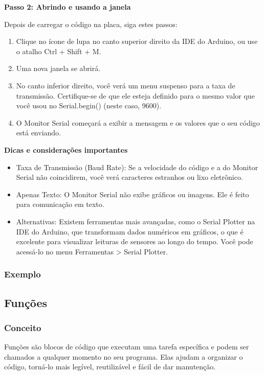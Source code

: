 \documentclass{report}
\begin{document}
	\begin{large}
		\textbf{Passo 2: Abrindo e usando a janela}
		\\
	\end{large}
	
	Depois de carregar o código na placa, siga estes passos:
	
	\begin{enumerate}
		\item Clique no ícone de lupa no canto superior direito da IDE do Arduino, ou use o atalho Ctrl + Shift + M.
		\item Uma nova janela se abrirá.
		\item No canto inferior direito, você verá um menu suspenso para a taxa de transmissão. Certifique-se de que ele esteja definido para o mesmo valor que você usou no Serial.begin() (neste caso, 9600).
		\item O Monitor Serial começará a exibir a mensagem e os valores que o seu código está enviando.
	\end{enumerate}
	
	\begin{large}
		\textbf{Dicas e considerações importantes}
		\\
	\end{large}
	\begin{itemize}
		\item Taxa de Transmissão (Baud Rate): Se a velocidade do código e a do Monitor Serial não coincidirem, você verá caracteres estranhos ou lixo eletrônico.
		\item Apenas Texto: O Monitor Serial não exibe gráficos ou imagens. Ele é feito para comunicação em texto.
		\item Alternativas: Existem ferramentas mais avançadas, como o Serial Plotter na IDE do Arduino, que transformam dados numéricos em gráficos, o que é excelente para visualizar leituras de sensores ao longo do tempo. Você pode acessá-lo no menu Ferramentas > Serial Plotter.
	\end{itemize}
	\subsubsection{Exemplo}
	\subsection{Funções}
	\subsubsection{Conceito}
	Funções são blocos de código que executam uma tarefa específica e podem ser chamados a qualquer momento no seu programa. Elas ajudam a organizar o código, torná-lo mais legível, reutilizável e fácil de dar manutenção.
	
\end{document}
